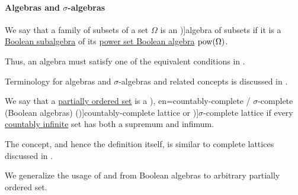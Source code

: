 \paragraph{Algebras and \( \sigma \)-algebras}

\begin{definition}\label{def:algebra_of_subsets}
  We say that a family of subsets of a set \( \Omega \) is an \term[ru=алгебра подмножеств (\cite[def. II.1.1]{Ширяев2007ВероятностиТом1})]{algebra of subsets} if it is a \hyperref[def:boolean_algebra/submodel]{Boolean subalgebra} of its \hyperref[thm:boolean_algebra_of_subsets]{power set Boolean algebra} \( \operatorname{pow}(\Omega) \).
\end{definition}
\begin{comments}
  \item Thus, an algebra must satisfy one of the equivalent conditions in .
  \item Terminology for algebras and \( \sigma \)-algebras and related concepts is discussed in .
\end{comments}

\begin{definition}\label{def:countably_complete_lattice}\mimprovised
  We say that a \hyperref[def:partially_ordered_set]{partially ordered set} is a \term[ru=(Булева алгебра) счётного типа (\cite[\S 1.6.3]{Владимиров1969БулевыАлгебры}), en=countably-complete / \( \sigma \)-complete (Boolean algebras) (\cite[244]{HalmosGivant2009BooleanAlgebras})]{countably-complete lattice} or \term[en=\( \sigma \)-complete (Boolean algebras) (\cite[244]{HalmosGivant2009BooleanAlgebras})]{\( \sigma \)-complete lattice} if every \hyperref[def:set_countability/countably_infinite]{countably infinite} set has both a supremum and infimum.
\end{definition}
\begin{comments}
  \item The concept, and hence the definition itself, is similar to complete lattices discussed in .
  \item We generalize the usage of \cite[\S 1.6.3]{Владимиров1969БулевыАлгебры} and \cite[244]{HalmosGivant2009BooleanAlgebras} from Boolean algebras to arbitrary partially ordered set.
\end{comments}

